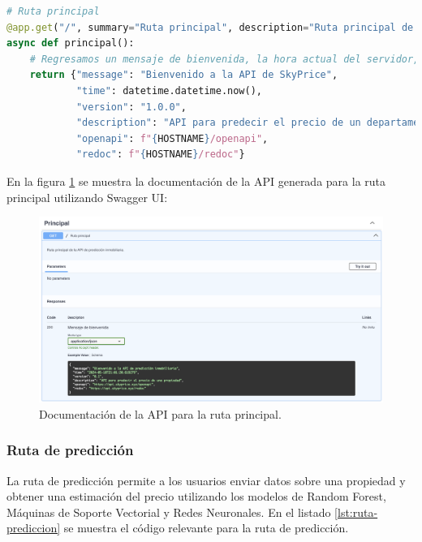 \begin{lstlisting}[language=python, caption={Ruta principal}, label={lst:ruta-principal}]
# Ruta principal
@app.get("/", summary="Ruta principal", description="Ruta principal de la API de predicción inmobiliaria.", tags=["Principal"], response_description="Mensaje de bienvenida", response_model=PrincipalResponse)
async def principal():
    # Regresamos un mensaje de bienvenida, la hora actual del servidor, la fecha, la versión del API, la descripción y un link a los docs de swagger.
    return {"message": "Bienvenido a la API de SkyPrice",
            "time": datetime.datetime.now(),
            "version": "1.0.0",
            "description": "API para predecir el precio de un departamento en la Ciudad de México, si deseas ver la documentación de la API, visita el enlace de OpenAPI (Swagger UI) o ReDoc:",
            "openapi": f"{HOSTNAME}/openapi",
            "redoc": f"{HOSTNAME}/redoc"}
\end{lstlisting}

En la figura \ref{fig:api-principal} se muestra la documentación de la API generada
para la ruta principal utilizando Swagger UI:

\begin{figure}[H]
    \centering
    \includegraphics[width=1.0\textwidth]{imagenes/05-implementacion/servicio-web/api-principal.png}
    \caption{Documentación de la API para la ruta principal.}
    \label{fig:api-principal}
\end{figure}

\subsubsection{Ruta de predicción}
La ruta de predicción permite a los usuarios enviar datos sobre una propiedad
y obtener una estimación del precio utilizando los modelos de Random Forest,
Máquinas de Soporte Vectorial y Redes Neuronales. En el listado \ref{lst:ruta-prediccion}
se muestra el código relevante para la ruta de predicción.

